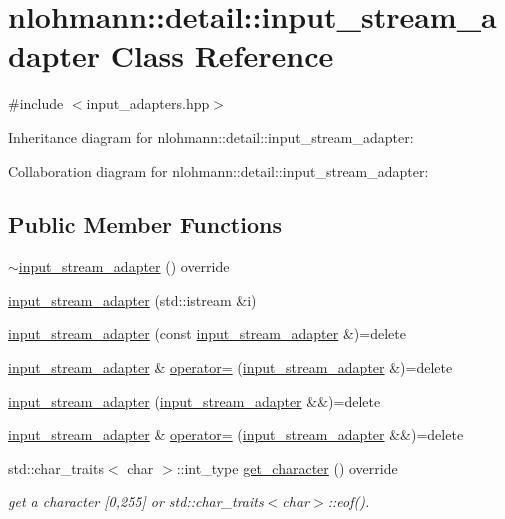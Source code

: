 \hypertarget{classnlohmann_1_1detail_1_1input__stream__adapter}{}\section{nlohmann\+:\+:detail\+:\+:input\+\_\+stream\+\_\+adapter Class Reference}
\label{classnlohmann_1_1detail_1_1input__stream__adapter}


{\ttfamily \#include $<$input\+\_\+adapters.\+hpp$>$}



Inheritance diagram for nlohmann\+:\+:detail\+:\+:input\+\_\+stream\+\_\+adapter\+:


Collaboration diagram for nlohmann\+:\+:detail\+:\+:input\+\_\+stream\+\_\+adapter\+:
\subsection*{Public Member Functions}
\begin{DoxyCompactItemize}
\item 
\hyperlink{classnlohmann_1_1detail_1_1input__stream__adapter_a2d71eb469267abd864f765481d1e823f}{$\sim$input\+\_\+stream\+\_\+adapter} () override
\item 
\hyperlink{classnlohmann_1_1detail_1_1input__stream__adapter_af487152e4606d013eb4ec6a90eaf82ea}{input\+\_\+stream\+\_\+adapter} (std\+::istream \&i)
\item 
\hyperlink{classnlohmann_1_1detail_1_1input__stream__adapter_a5190fe4d0c5ff2e3b348b28ee3bb2218}{input\+\_\+stream\+\_\+adapter} (const \hyperlink{classnlohmann_1_1detail_1_1input__stream__adapter}{input\+\_\+stream\+\_\+adapter} \&)=delete
\item 
\hyperlink{classnlohmann_1_1detail_1_1input__stream__adapter}{input\+\_\+stream\+\_\+adapter} \& \hyperlink{classnlohmann_1_1detail_1_1input__stream__adapter_aeac5048221929b8f7558d1698dd0fb3a}{operator=} (\hyperlink{classnlohmann_1_1detail_1_1input__stream__adapter}{input\+\_\+stream\+\_\+adapter} \&)=delete
\item 
\hyperlink{classnlohmann_1_1detail_1_1input__stream__adapter_a0ae74b874f7db43640905cb7f2442b1d}{input\+\_\+stream\+\_\+adapter} (\hyperlink{classnlohmann_1_1detail_1_1input__stream__adapter}{input\+\_\+stream\+\_\+adapter} \&\&)=delete
\item 
\hyperlink{classnlohmann_1_1detail_1_1input__stream__adapter}{input\+\_\+stream\+\_\+adapter} \& \hyperlink{classnlohmann_1_1detail_1_1input__stream__adapter_a3577dff99cc91968557b52959b0363e4}{operator=} (\hyperlink{classnlohmann_1_1detail_1_1input__stream__adapter}{input\+\_\+stream\+\_\+adapter} \&\&)=delete
\item 
std\+::char\+\_\+traits$<$ char $>$\+::int\+\_\+type \hyperlink{classnlohmann_1_1detail_1_1input__stream__adapter_ae0760af923583de6354725e901d1869d}{get\+\_\+character} () override
\begin{DoxyCompactList}\small\item\em get a character \mbox{[}0,255\mbox{]} or std\+::char\+\_\+traits$<$char$>$\+::eof(). \end{DoxyCompactList}\end{DoxyCompactItemize}
